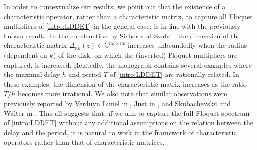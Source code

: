 \documentclass[english]{myarticle}
\begin{document}
\begin{sloppypar}
In order to contextualize our results, we point out that the existence of a characteristic operator, rather than a characteristic matrix, to capture all Floquet multipliers of \eqref{intro:LDDET} in the general case, is in line with the previously known results. In the construction by Sieber and Szalai \cite{Sieber2011}, the dimension of the characteristic matrix $\Delta_{nk}(z) \in \mathbb{C}^{nk \times nk}$ increases unboundedly when the radius (dependent on $k$) of the disk, on which the (inverted) Floquet multipliers are captured, is increased. Relatedly, the monograph \cite{Kaashoek2022} contains several examples where the maximal delay $h$ and period $T$ of \eqref{intro:LDDET} are rationally related. In these examples, the dimension of the characteristic matrix increases as the ratio $T/h$ becomes more irrational. We also note that similar observations were previously reported by Verduyn Lunel in \cite{Lunel2001}, Just in \cite{Just2000}, and Skubachevskii and Walter in \cite{Skubachevskii2006}. This all suggests that, if we aim to capture the full Floquet spectrum of \eqref{intro:LDDET} without any additional assumptions on the relation between the delay and the period, it is natural to work in the framework of characteristic operators rather than that of characteristic matrices.


\end{sloppypar}
\end{document}
